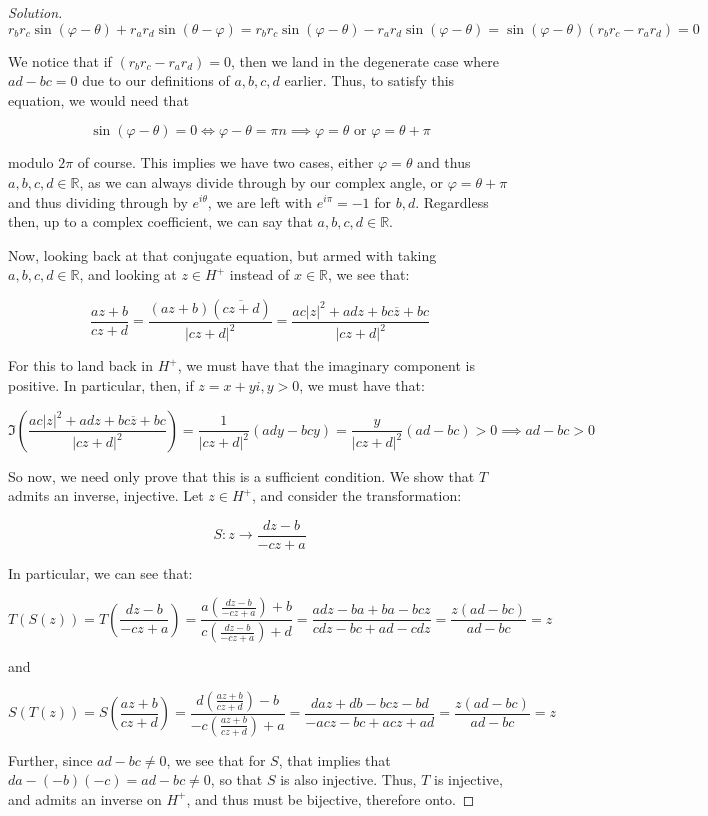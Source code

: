 \documentclass[10pt]{article}
\begin{document}
\begin{proof}[Solution]
$$ r_b r_c \sin(\varphi - \theta) + r_a r_d \sin(\theta - \varphi) = r_b r_c \sin(\varphi - \theta) - r_a r_d \sin(\varphi - \theta) = \sin(\varphi - \theta)(r_b r_c - r_a r_d)  = 0$$

We notice that if $(r_b r_c - r_a r_d) = 0$, then we land in the degenerate case where $ad - bc = 0$ due to our definitions of $a,b,c,d$ earlier. Thus, to satisfy this equation, we would need that

$$  \sin(\varphi - \theta)  = 0 \iff \varphi - \theta = \pi n \implies \varphi = \theta \text{ or } \varphi = \theta + \pi $$

modulo $2\pi$ of course. This implies we have two cases, either $\varphi = \theta$ and thus $a,b,c,d \in \mathbb{R}$, as we can always divide through by our complex angle, or $\varphi = \theta + \pi$ and thus dividing through by $e^{i \theta}$, we are left with $e^{i \pi} = -1$ for $b,d$. Regardless then, up to a complex coefficient, we can say that $a,b,c,d \in \mathbb{R}$. 

Now, looking back at that conjugate equation, but armed with taking $a,b,c,d \in \mathbb{R}$, and looking at $z \in H^+$ instead of $x \in \mathbb{R}$, we see that:

$$  \frac{az  + b }{cz + d} =  \frac{(az + b) (\overline{cz + d})}{ |cz + d|^2 } = \frac{ac|z|^2 + adz + bc\overline{z} + bc}{ |cz + d|^2} $$

For this to land back in $H^+$, we must have that the imaginary component is positive. In particular, then, if $z = x + yi, y > 0$, we must have that:

$$ \Im\left( \frac{ac|z|^2 + adz + bc\overline{z} + bc}{ |cz + d|^2} \right) = \frac{1}{|cz + d|^2} (ady - bcy) = \frac{y}{|cz + d|^2} (ad - bc) > 0 \implies ad - bc > 0 $$

So now, we need only prove that this is a sufficient condition. We show that $T$ admits an inverse, injective. Let $z \in H^+$, and consider the transformation:

$$S: z \to \frac{dz - b}{-cz + a} $$

In particular, we can see that:

$$T(S(z)) = T\left(\frac{dz - b}{-cz + a}\right) = \frac{a\left(\frac{dz - b}{-cz + a}\right) + b}{c\left(\frac{dz - b}{-cz + a}\right) +d } = \frac{ adz - ba + ba - bcz }{cdz - bc + ad - cdz} = \frac{z(ad - bc)}{ad - bc} = z$$

and

$$ S(T(z)) = S\left( \frac{az  + b }{cz + d}\right) =   \frac{d\left( \frac{az  + b }{cz + d}\right) - b}{-c\left( \frac{az  + b }{cz + d}\right) + a} = \frac{daz + db - bcz - bd}{-acz -bc + acz + ad} = \frac{z(ad - bc)}{ad - bc} = z$$

Further, since $ad - bc \not = 0$, we see that for $S$, that implies that $da - (-b)(-c) = ad - bc \not = 0$, so that $S$ is also injective. Thus, $T$ is injective, and admits an inverse on $H^+$, and thus must be bijective, therefore onto. 
\end{proof}
\end{document}

